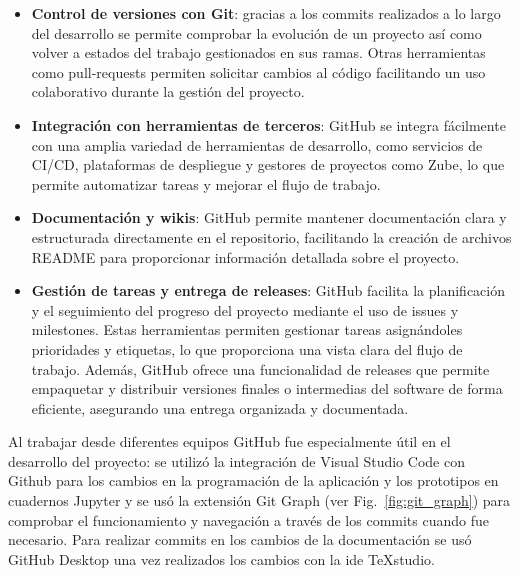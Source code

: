 	\begin{itemize}
		
		\item \textbf{Control de versiones con Git}: gracias a los commits realizados a lo largo del desarrollo se permite comprobar la evolución de un proyecto así como volver a estados del trabajo gestionados en sus ramas. Otras herramientas como pull-requests permiten solicitar cambios al código facilitando un uso colaborativo durante la gestión del proyecto.
		
		\item \textbf{Integración con herramientas de terceros}: GitHub se integra fácilmente con una amplia variedad de herramientas de desarrollo, como servicios de CI/CD, plataformas de despliegue y gestores de proyectos como Zube, lo que permite automatizar tareas y mejorar el flujo de trabajo.
		
		\item \textbf{Documentación y wikis}: GitHub permite mantener documentación clara y estructurada directamente en el repositorio, facilitando la creación de archivos README para proporcionar información detallada sobre el proyecto.
		
		\item \textbf{Gestión de tareas y entrega de releases}: GitHub facilita la planificación y el seguimiento del progreso del proyecto mediante el uso de issues y milestones. Estas herramientas permiten gestionar tareas asignándoles prioridades y etiquetas, lo que proporciona una vista clara del flujo de trabajo. Además, GitHub ofrece una funcionalidad de releases que permite empaquetar y distribuir versiones finales o intermedias del software de forma eficiente, asegurando una entrega organizada y documentada.
		
		
	\end{itemize}
	Al trabajar desde diferentes equipos GitHub fue especialmente útil en el desarrollo del proyecto: se utilizó la integración de Visual Studio Code con Github para los cambios en la programación de la aplicación y los prototipos en cuadernos Jupyter y se usó la extensión Git Graph (ver Fig.~\ref{fig:git_graph}) para comprobar el funcionamiento y navegación a través de los commits cuando fue necesario. Para realizar commits en los cambios de la documentación se usó GitHub Desktop una vez realizados los cambios con la \acrshort{ide} TeXstudio.
	
